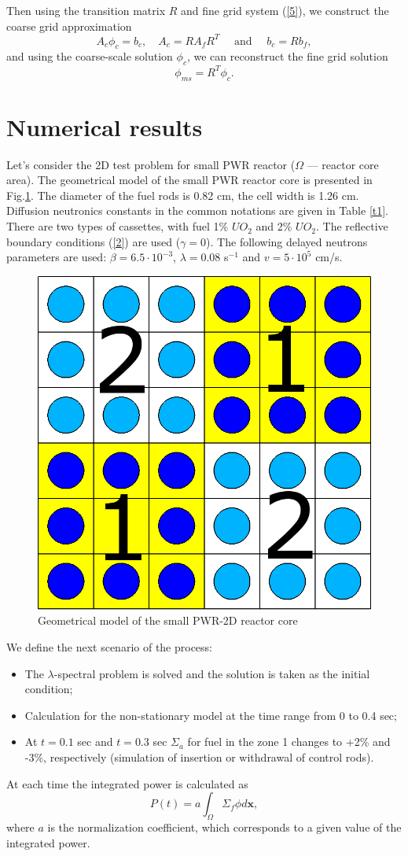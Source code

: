 \documentclass[runningheads]{llncs}
\begin{document}
Then using the transition matrix $R$ and fine grid system (\ref{5}), we construct the coarse grid approximation
\begin{equation}\label{9}
A_c \phi_c = b_c, \quad 
A_c = R A_f R^T 
\quad \text{ and } \quad 
b_c = R b_f,
\end{equation}  
and using the coarse-scale solution $\phi_c$, we can  reconstruct the fine grid solution 
\[
\phi_{ms} = R^T \phi_c.
\]

\section{Numerical results}
Let's consider the 2D test problem for small PWR reactor ($\Omega$ --- reactor core area). 
The geometrical model of the small PWR reactor core is presented in Fig.\ref{p3}. 
The diameter of the fuel rods is 0.82 cm, the cell width is 1.26 cm.
Diffusion neutronics constants in the common notations are given in Table \ref{t1}. 
There are two types of cassettes, with fuel 1\% $UO_2$ and 2\% $UO_2$.
The reflective boundary conditions (\ref{2}) are used ($\gamma = 0$).
The following delayed neutrons parameters are used: $\beta = 6.5 \cdot 10^{-3}$, $\lambda = 0.08$ s$^{-1}$ and $v = 5 \cdot 10^5$ cm/s.

\begin{figure}[h]
  \begin{center}
    \includegraphics[width=0.5\linewidth] {smallpwr.png}
	\caption{Geometrical model of the small PWR-2D reactor core}
	\label{p3}
  \end{center}
\end{figure} 

We define the next scenario of the process:
\begin{itemize}
\item The $\lambda$-spectral problem is solved and the solution is taken as the initial condition;
\item Calculation for the non-stationary model at the time range from 0 to 0.4 sec;
\item At $t=0.1$ sec and $t=0.3$ sec $\Sigma_a$ for fuel in the zone 1 changes to +2\% and -3\%, respectively (simulation of insertion or withdrawal of control rods).
\end{itemize}
At each time the integrated power is calculated as
\[P(t) = a\int_{\Omega}\Sigma_f \phi d\bm x,\]
where $a$ is the normalization coefficient, which corresponds to a given value of the integrated power.
\end{document}
